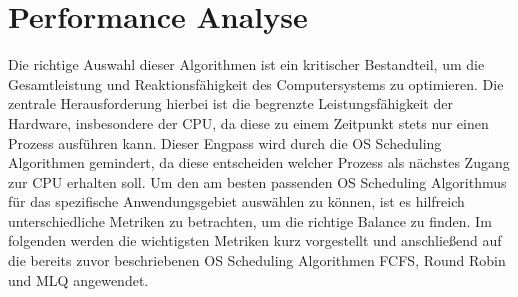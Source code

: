 \chapter{Performance Analyse}
Die richtige Auswahl dieser Algorithmen ist ein kritischer Bestandteil, um die Gesamtleistung und Reaktionsfähigkeit des Computersystems zu optimieren. Die zentrale Herausforderung hierbei ist die begrenzte Leistungsfähigkeit der Hardware, insbesondere der \ac{CPU}, da diese zu einem Zeitpunkt stets nur einen Prozess ausführen kann. Dieser Engpass wird durch die OS Scheduling Algorithmen gemindert, da diese entscheiden welcher Prozess als nächstes Zugang zur \ac{CPU} erhalten soll. Um den am besten passenden OS Scheduling Algorithmus für das spezifische Anwendungsgebiet auswählen zu können, ist es hilfreich unterschiedliche Metriken zu betrachten, um die richtige Balance zu finden. Im folgenden werden die wichtigsten Metriken kurz vorgestellt und anschließend auf die bereits zuvor beschriebenen OS Scheduling Algorithmen \ac{FCFS}, Round Robin und \ac{MLQ} angewendet. 
